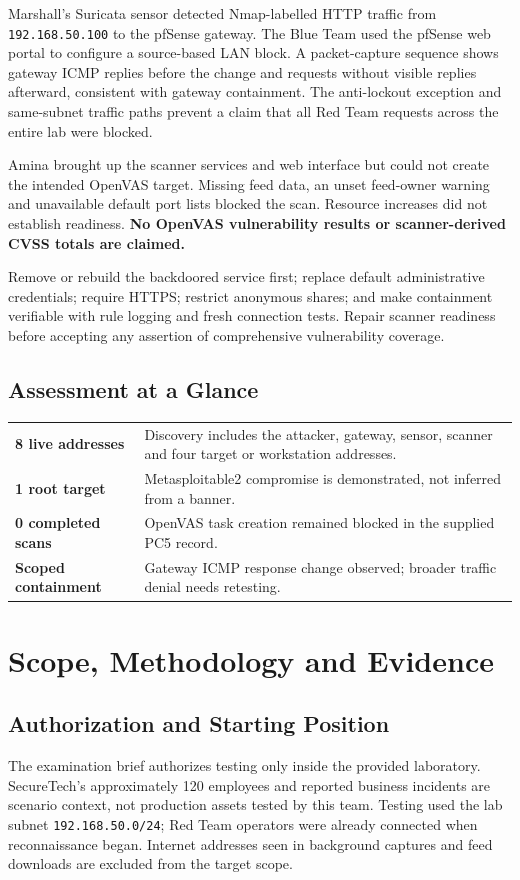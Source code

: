 \documentclass[11pt,a4paper]{article}
\newcommand{\partheading}[2]{\clearpage\noindent{\small\bfseries\color{steel}#1}\par\section{#2}}
\newcommand{\insight}[2]{\begin{notebox}[#1]#2\end{notebox}}
\begin{document}
Marshall's Suricata sensor detected Nmap-labelled HTTP traffic from \texttt{192.168.50.100} to the pfSense gateway. The Blue Team used the pfSense web portal to configure a source-based LAN block. A packet-capture sequence shows gateway ICMP replies before the change and requests without visible replies afterward, consistent with gateway containment. The anti-lockout exception and same-subnet traffic paths prevent a claim that all Red Team requests across the entire lab were blocked.

Amina brought up the scanner services and web interface but could not create the intended OpenVAS target. Missing feed data, an unset feed-owner warning and unavailable default port lists blocked the scan. Resource increases did not establish readiness. \textbf{No OpenVAS vulnerability results or scanner-derived CVSS totals are claimed.}

\insight{Management Priority}{Remove or rebuild the backdoored service first; replace default administrative credentials; require HTTPS; restrict anonymous shares; and make containment verifiable with rule logging and fresh connection tests. Repair scanner readiness before accepting any assertion of comprehensive vulnerability coverage.}

\subsection{Assessment at a Glance}
\begin{tabularx}{\linewidth}{@{}L{2.7cm}X@{}}
\toprule
\textbf{8 live addresses} & Discovery includes the attacker, gateway, sensor, scanner and four target or workstation addresses.\\
\textbf{1 root target} & Metasploitable2 compromise is demonstrated, not inferred from a banner.\\
\textbf{0 completed scans} & OpenVAS task creation remained blocked in the supplied PC5 record.\\
\textbf{Scoped containment} & Gateway ICMP response change observed; broader traffic denial needs retesting.\\
\bottomrule
\end{tabularx}

\partheading{01 / ENGAGEMENT}{Scope, Methodology and Evidence}
\label{sec:scope}
\subsection{Authorization and Starting Position}
The examination brief authorizes testing only inside the provided laboratory. SecureTech's approximately 120 employees and reported business incidents are scenario context, not production assets tested by this team. Testing used the lab subnet \texttt{192.168.50.0/24}; Red Team operators were already connected when reconnaissance began. Internet addresses seen in background captures and feed downloads are excluded from the target scope.
\end{document}
